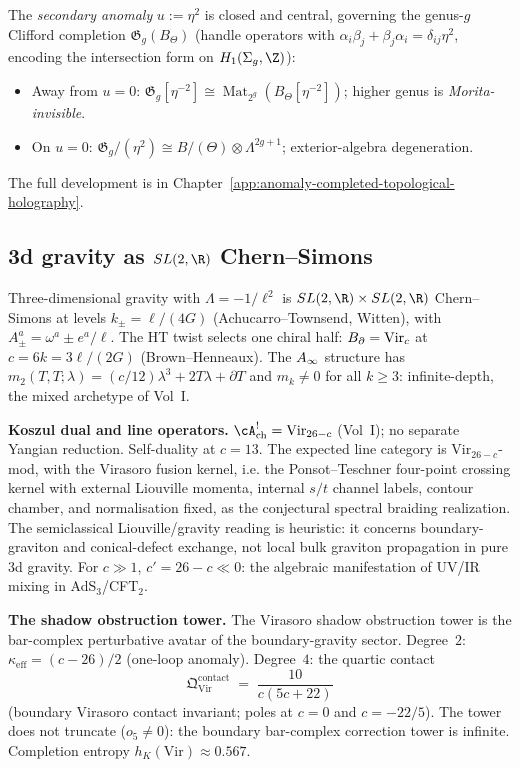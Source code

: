 The \emph{secondary anomaly} $u := \eta^2$ is closed and central,
governing the genus-$g$ Clifford completion
$\mathfrak G_g(B_\Theta)$ (handle operators with
$\alpha_i \beta_j + \beta_j \alpha_i = \delta_{ij} \eta^2$,
encoding the intersection form on $H_1(\Sigma_g, \Z)$):
\begin{itemize}
\item Away from $u = 0$:
 $\mathfrak G_g[\eta^{-2}]
 \cong \operatorname{Mat}_{2^g}(B_\Theta[\eta^{-2}])$;
 higher genus is \emph{Morita-invisible}.
\item On $u = 0$:
 $\mathfrak G_g / (\eta^2) \cong B/(\Theta) \otimes
 \Lambda^{2g+1}$; exterior-algebra degeneration.
\end{itemize}
The full development is in
Chapter~\ref{app:anomaly-completed-topological-holography}.

\subsection*{3d gravity as $SL(2,\R)$ Chern--Simons}

Three-dimensional gravity with $\Lambda = -1/\ell^2$ is
$SL(2,\R) \times SL(2,\R)$ Chern--Simons at levels
$k_\pm = \ell/(4G)$ (Achucarro--Townsend, Witten), with
$A_\pm^a = \omega^a \pm e^a/\ell$. The HT twist selects
one chiral half: $B_{\partial} = \mathrm{Vir}_c$ at
$c = 6k = 3\ell/(2G)$ (Brown--Henneaux).
The $A_\infty$ structure has
$m_2(T,T;\lambda) = (c/12)\lambda^3 + 2T\lambda + \partial T$ and
$m_k \ne 0$ for all $k \ge 3$: infinite-depth, the mixed
archetype of Vol~I.

\medskip
\noindent\textbf{Koszul dual and line operators.}\enspace
$\cA^!_{\mathrm{ch}} = \mathrm{Vir}_{26-c}$ (Vol~I); no separate
Yangian reduction. Self-duality at $c = 13$.
The expected line category is $\mathrm{Vir}_{26-c}$-mod, with the
Virasoro fusion kernel, i.e. the Ponsot--Teschner four-point crossing
kernel with external Liouville momenta, internal $s/t$ channel labels,
contour chamber, and normalisation fixed, as the conjectural spectral
braiding realization.  The
semiclassical Liouville/gravity reading is heuristic: it concerns
boundary-graviton and conical-defect exchange, not local bulk graviton
propagation in pure 3d gravity.
For $c \gg 1$, $c' = 26 - c \ll 0$: the algebraic
manifestation of UV/IR mixing in AdS$_3$/CFT$_2$.

\medskip
\noindent\textbf{The shadow obstruction tower.}\enspace
The Virasoro shadow obstruction tower is the bar-complex perturbative
avatar of the boundary-gravity sector. Degree~$2$:
$\kappa_{\mathrm{eff}} = (c-26)/2$ (one-loop anomaly).
Degree~$4$: the quartic contact
\[
\mathfrak{Q}^{\mathrm{contact}}_{\mathrm{Vir}}
\;=\; \frac{10}{c(5c+22)}
\]
(boundary Virasoro contact invariant; poles at $c = 0$ and
$c = -22/5$).  The tower does not truncate ($o_5 \ne 0$): the
boundary bar-complex correction tower is infinite. Completion entropy
$h_K(\mathrm{Vir}) \approx 0.567$.

